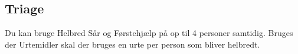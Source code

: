 \subsection{Triage}
Du kan bruge Helbred Sår og Førstehjælp på op til 4 personer samtidig. Bruges der Urtemidler skal der bruges en urte per person som bliver helbredt.
